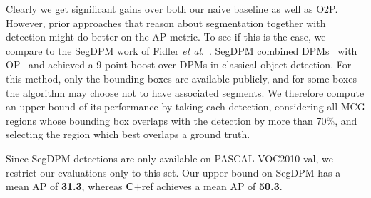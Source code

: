 \documentclass[runningheads]{llncs}
\newcommand\etal{\emph{et al}.\ }
\newcommand\methodC{\textbf{C}}
\begin{document}
Clearly we get significant gains over both our naive baseline as well as O2P. However, prior approaches that reason about segmentation together with detection might do better on the AP metric. To see if this is the case, we compare to the SegDPM work of Fidler \etal\cite{FidlerCVPR13}. SegDPM combined DPMs~\cite{FelzenszwalbPAMI10} with OP~\cite{CarreiraECCV12} and achieved a 9 point boost over DPMs in classical object detection. For this method, only the bounding boxes are available publicly, and for some boxes the algorithm may choose not to have associated segments. We therefore compute an upper bound of its performance by taking each detection, considering all MCG regions whose bounding box overlaps with the detection by more than 70\%, and selecting the region which best overlaps a ground truth. 

Since SegDPM detections are only available on PASCAL VOC2010 val, we restrict our evaluations only to this set.  Our upper bound on SegDPM has a mean AP of \textbf{31.3}, whereas \methodC{}+ref achieves a mean AP of \textbf{50.3}.
\end{document}
